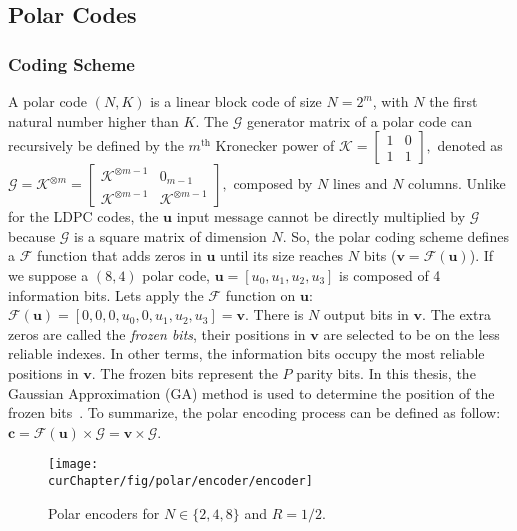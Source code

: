 \subsection{Polar Codes}
\label{sec:ctx_polar}

\subsubsection{Coding Scheme}

A polar code $(N,K)$ is a linear block code of size $N = 2^m$, with $N$ the
first natural number higher than $K$. The $\bm{\mathcal{G}}$ generator matrix of
a polar code can recursively be defined by the $m^\text{th}$ Kronecker power of
$\bm{\mathcal{K}} =
\begin{bmatrix}
1 & 0 \\
1 & 1
\end{bmatrix},$
denoted as
$
\bm{\mathcal{G}} = \bm{\mathcal{K}}^{\otimes m} =
\begin{bmatrix}
\bm{\mathcal{K}}^{\otimes m-1} & 0_{m -1} \\
\bm{\mathcal{K}}^{\otimes m-1} & \bm{\mathcal{K}}^{\otimes m-1}
\end{bmatrix},
$
composed by $N$ lines and $N$ columns. Unlike for the LDPC codes, the $\bm{u}$
input message cannot be directly multiplied by $\bm{\mathcal{G}}$ because
$\bm{\mathcal{G}}$ is a square matrix of dimension $N$. So, the polar coding
scheme defines a $\mathcal{F}$ function that adds zeros in $\bm{u}$ until its
size reaches $N$ bits ($\bm{v} = \mathcal{F}(\bm{u})$). If we suppose a $(8,4)$
polar code, $\bm{u} = [u_0, u_1, u_2, u_3]$ is composed of 4 information bits.
Lets apply the $\mathcal{F}$ function on $\bm{u}$: $\mathcal{F}(\bm{u}) =
[0, 0, 0, u_0, 0, u_1, u_2, u_3] = \bm{v}$. There is $N$ output bits in
$\bm{v}$. The extra zeros are called the \emph{frozen bits}, their positions in
$\bm{v}$ are selected to be on the less reliable indexes. In other terms, the
information bits occupy the most reliable positions in $\bm{v}$. The frozen bits
represent the $P$ parity bits. In this thesis, the Gaussian Approximation (GA)
method is used to determine the position of the frozen bits~\cite{Trifonov2012}.
To summarize, the polar encoding process can be defined as follow: $\bm{c} =
\mathcal{F}(\bm{u}) \times \bm{\mathcal{G}} = \bm{v} \times \bm{\mathcal{G}}$.

\begin{figure}[htp]
  \centering
  \texttt{[image: \\curChapter/fig/polar/encoder/encoder]}
  \caption{Polar encoders for $N \in \{2, 4, 8\}$ and $R = 1/2$.}
  \label{fig:ctx_polar_encoder}
\end{figure}

